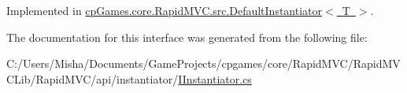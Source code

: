Implemented in \mbox{\hyperlink{classcp_games_1_1core_1_1_rapid_m_v_c_1_1src_1_1_default_instantiator_a6379b00cf41f87d381e58e2afd0ac159}{cp\+Games.\+core.\+Rapid\+M\+V\+C.\+src.\+Default\+Instantiator$<$ T $>$}}.



The documentation for this interface was generated from the following file\+:\begin{DoxyCompactItemize}
\item 
C\+:/\+Users/\+Misha/\+Documents/\+Game\+Projects/cpgames/core/\+Rapid\+M\+V\+C/\+Rapid\+M\+V\+C\+Lib/\+Rapid\+M\+V\+C/api/instantiator/\mbox{\hyperlink{_i_instantiator_8cs}{I\+Instantiator.\+cs}}\end{DoxyCompactItemize}
